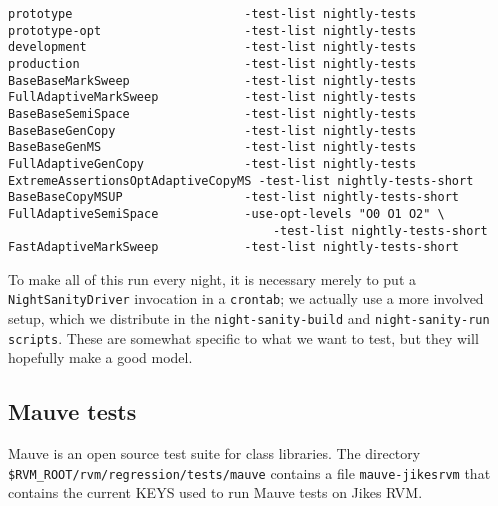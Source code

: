 \begin{verbatim}
prototype                        -test-list nightly-tests
prototype-opt                    -test-list nightly-tests
development                      -test-list nightly-tests
production                       -test-list nightly-tests
BaseBaseMarkSweep                -test-list nightly-tests
FullAdaptiveMarkSweep            -test-list nightly-tests
BaseBaseSemiSpace                -test-list nightly-tests
BaseBaseGenCopy                  -test-list nightly-tests
BaseBaseGenMS                    -test-list nightly-tests
FullAdaptiveGenCopy              -test-list nightly-tests
ExtremeAssertionsOptAdaptiveCopyMS -test-list nightly-tests-short
BaseBaseCopyMSUP                 -test-list nightly-tests-short
FullAdaptiveSemiSpace            -use-opt-levels "O0 O1 O2" \
                                     -test-list nightly-tests-short
FastAdaptiveMarkSweep            -test-list nightly-tests-short
\end{verbatim}

 To make all of this run every night, it is necessary merely to put a
{\tt Night\-San\-i\-ty\-Dri\-ver} invocation in a {\tt crontab}; we actually use a more
involved setup, which we distribute in the {\tt night-sanity-build} and
{\tt night-sanity-run scripts}.  These are somewhat specific to what we want
to test, but they will hopefully make a good model.

\subsection{Mauve tests}
Mauve is an open source test suite for class libraries.  The directory 
{\tt{\$RVM\_\-ROOT/\-rvm/\-re\-gres\-sion/\-tests/\-mauve}} contains a file
{\tt mauve-jikesrvm} that contains the current KEYS used to run Mauve tests
on Jikes RVM. 

